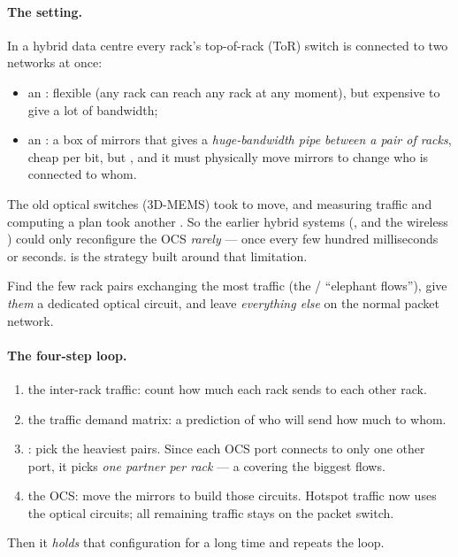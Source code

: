 \paragraph{The setting.} In a hybrid data centre every rack's top-of-rack (ToR) switch is connected to two networks at once:
\begin{itemize}
\item an : flexible (any rack can reach any rack at any moment), but expensive to give a lot of bandwidth;
\item an : a box of mirrors that gives a \emph{huge-bandwidth pipe between a pair of racks}, cheap per bit, but , and it must physically move mirrors to change who is connected to whom.
\end{itemize}
The old optical switches (3D-MEMS) took  to move, and measuring traffic and computing a plan took another . So the earlier hybrid systems (, and the wireless ) could only reconfigure the OCS \emph{rarely} --- once every few hundred milliseconds or seconds.  is the strategy built around that limitation.

\begin{keybox}
Find the few rack pairs exchanging the most traffic (the  / ``elephant flows''), give \emph{them} a dedicated optical circuit, and leave \emph{everything else} on the normal packet network.
\end{keybox}

\paragraph{The four-step loop.}
\begin{enumerate}
\item {} the inter-rack traffic: count how much each rack sends to each other rack.
\item {} the traffic demand matrix: a prediction of who will send how much to whom.
\item {}: pick the heaviest pairs. Since each OCS port connects to only one other port, it picks \emph{one partner per rack} --- a  covering the biggest flows.
\item {} the OCS: move the mirrors to build those circuits. Hotspot traffic now uses the optical circuits; all remaining traffic stays on the packet switch.
\end{enumerate}
Then it \emph{holds} that configuration for a long time and repeats the loop.

